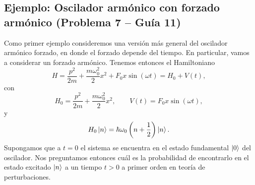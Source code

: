 \documentclass[10pt, a4paper]{article}
\numberwithin{equation}{subsection}
\begin{document}
\subsection{Ejemplo: Oscilador armónico con forzado armónico
  (Problema 7 -- Guía 11)}
Como primer ejemplo consideremos una versión más general del oscilador armónico
forzado, en donde el forzado depende del tiempo. En particular, vamos a
considerar un forzado armónico. Tenemos entonces el Hamiltoniano
\begin{equation}
  H = \frac{p^2}{2m} + \frac{m\omega_0^2}{2}x^2 + F_0x\sin(\omega t)
  = H_0 + V(t),
\end{equation}
con
\begin{equation}
  H_0 = \frac{p^2}{2m} + \frac{m\omega_0^2}{2}x^2, \qquad 
  V(t) = F_0x\sin(\omega t),
\end{equation}
y
\begin{equation}
  H_0\ket{n} = \hbar\omega_0\left(n + \frac{1}{2}\right)\ket{n}.
\end{equation}
Supongamos que a $t = 0$ el sistema se encuentra en el estado fundamental
$\ket{0}$ del oscilador. Nos preguntamos entonces cuál es la probabilidad de
encontrarlo en el estado excitado $\ket{n}$ a un tiempo $t > 0$ a primer orden
en teoría de perturbaciones.
\end{document}
